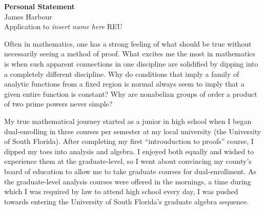 \documentclass[12pt]{article}
\begin{document}
\begin{center}
  \textbf{Personal Statement}\\
  James Harbour \\
  Application to \emph{insert name here} REU
\end{center}


Often in mathematics, one has a strong feeling of what should be true without necessarily seeing a method of proof. What excites me the most in mathematics is when such apparent connections in one discipline are solidified by dipping into a completely different discipline.
Why do conditions that imply a family of analytic functions from a fixed region is normal always seem to imply that a given entire function is constant? Why are nonabelian groups of order a product of two prime powers never simple?








My true mathematical journey started as a junior in high school when I began dual-enrolling in three courses per semester at my local university (the University of South Florida). After completing my first ``introuduction to proofs'' course, I dipped my toes into analysis and algebra. I enjoyed both equally and wished to experience them at the graduate-level, so I went about convincing my county's board of education to allow me to take graduate courses for dual-enrollment. As the graduate-level analysis courses were offered in the mornings, a time during which I was required by law to attend high school every day, I was pushed towards entering the University of South Florida's graduate algebra sequence.
\end{document}
